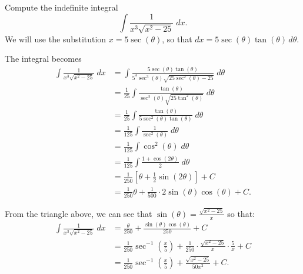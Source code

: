 \documentclass[handout]{ximera}
\begin{document}
\begin{example}[example 8]
Compute the indefinite integral
\[
\int \frac{1}{x^3\sqrt{x^2-25}} \; dx.
\]
We will use the substitution $x = 5\sec(\theta)$,
so that $dx = 5\sec(\theta)\tan(\theta) \, d\theta$.

The integral becomes
\begin{align*}
\int \frac{1}{x^3\sqrt{x^2-25}}\; dx &= \int \frac{5\sec(\theta)\tan(\theta)}{5^3\sec^3(\theta)\sqrt{25\sec^2(\theta)-25}}\; d\theta\\[6pt]
                                 &=  \frac{1}{25}\int \frac{\tan(\theta)}{\sec^2(\theta)\sqrt{25\tan^2(\theta)}}\; d\theta\\[6pt]
                                 &=  \frac{1}{25}\int \frac{\tan(\theta)}{5\sec^2(\theta)\tan(\theta)}\; d\theta\\[6pt]
                                  &=  \frac{1}{125} \int \frac{1}{\sec^2(\theta)} \; d\theta\\[6pt]
                                  &= \frac{1}{125} \int \cos^2(\theta)  \; d\theta\\[6pt]
                                  &= \frac{1}{125} \int \frac{1+\cos(2\theta)}{2} \; d\theta\\[6pt]
                                  &= \frac{1}{250}\left[\theta + \frac12 \sin(2\theta)\right] + C\\[6pt]
                                  &= \frac{1}{250} \theta + \frac{1}{500} \cdot 2\sin(\theta)\cos(\theta) + C.
\end{align*}


\begin{image}
\end{image}




From the triangle above, we can see that $\sin(\theta) = \frac{\sqrt{x^2-25}}{x}$ so that:
\begin{align*}
\int \frac{1}{x^3\sqrt{x^2-25}} \; dx &=  \frac{\theta}{250}  + \frac{\sin(\theta)\cos(\theta)}{250} + C \\
&= \frac{1}{250} \sec^{-1}\left(\frac{x}{5}\right) + \frac{1}{250} \cdot \frac{\sqrt{x^2 - 25}}{x}\cdot \frac{5}{x} + C\\
&= \frac{1}{250} \sec^{-1}\left(\frac{x}{5}\right) + \frac{\sqrt{x^2 - 25}}{50x^2}+ C.
\end{align*}

\end{example}
\end{document}
